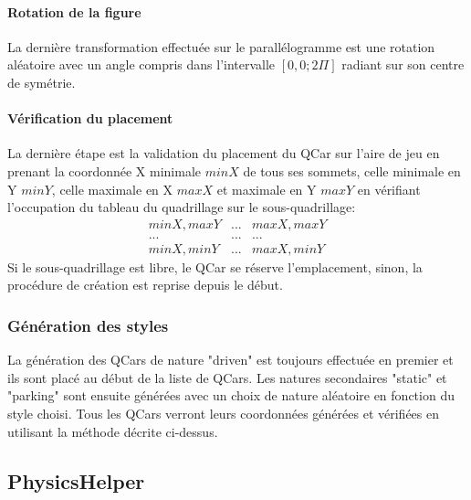 \documentclass[a4paper, 12pt]{article}
\begin{document}
\paragraph{Rotation de la figure}
La dernière transformation effectuée sur le parallélogramme est une rotation aléatoire avec un angle compris dans l'intervalle $[0,0; 2\Pi]$ radiant sur son centre de symétrie.
\paragraph{Vérification du placement}
La dernière étape est la validation du placement du QCar sur l'aire de jeu en prenant la coordonnée X minimale $minX$ de tous ses sommets, celle minimale en Y $minY$, celle maximale en X $maxX$ et maximale en Y $maxY$ en vérifiant l'occupation du tableau du quadrillage sur le sous-quadrillage:
\[\begin{array}{ccc}
 minX,maxY & ... & maxX,maxY \\ 
 ... & ... & ... \\ 
 minX,minY & ... & maxX,minY
\end{array}\]
Si le sous-quadrillage est libre, le QCar se réserve l'emplacement, sinon, la procédure de création est reprise depuis le début.
\subsubsection{Génération des styles}
La génération des QCars de nature "driven" est toujours effectuée en premier et ils sont placé au début de la liste de QCars. Les natures secondaires "static" et "parking" sont ensuite générées avec un choix de nature aléatoire en fonction du style choisi. Tous les QCars verront leurs coordonnées générées et vérifiées en utilisant la méthode décrite ci-dessus.
\subsection{PhysicsHelper}
\end{document}
